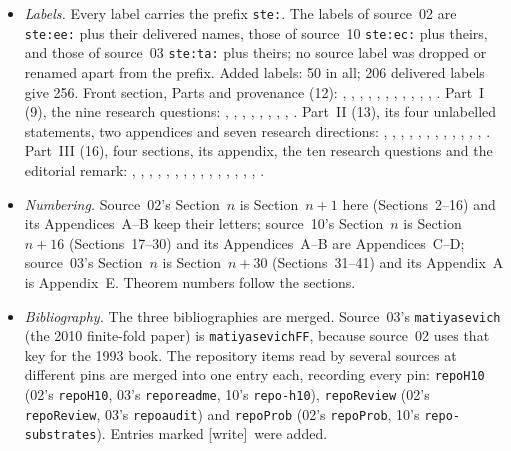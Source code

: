 \documentclass[11pt,letterpaper]{article}
\theoremstyle{definition}
\theoremstyle{remark}
\newcommand{\wtag}{\textup{[write]}}
\begin{document}
\begin{itemize}
\item \emph{Labels.} Every label carries the prefix \texttt{ste:}. The labels of source~02 are \texttt{ste:ee:} plus their delivered names, those of source~10 \texttt{ste:ec:} plus theirs, and those of source~03 \texttt{ste:ta:} plus theirs; no source label was dropped or renamed apart from the prefix. Added labels: 50 in all; 206 delivered labels give 256. Front section, Parts and provenance (12): , , , , , , , , , , , . Part~I (9), the nine research questions: , , , , , , , , . Part~II (13), its four unlabelled statements, two appendices and seven research directions: , , , , , , , , , , , , . Part~III (16), four sections, its appendix, the ten research questions and the editorial remark: , , , , , , , , , , , , , , , .
\item \emph{Numbering.} Source~02's Section~$n$ is Section~$n+1$ here (Sections~2--16) and its Appendices~A--B keep their letters; source~10's Section~$n$ is Section~$n+16$ (Sections~17--30) and its Appendices~A--B are Appendices~C--D; source~03's Section~$n$ is Section~$n+30$ (Sections~31--41) and its Appendix~A is Appendix~E. Theorem numbers follow the sections.
\item \emph{Bibliography.} The three bibliographies are merged. Source~03's \texttt{matiyasevich} (the 2010 finite-fold paper) is \texttt{matiyasevichFF}, because source~02 uses that key for the 1993 book. The repository items read by several sources at different pins are merged into one entry each, recording every pin: \texttt{repoH10} (02's \texttt{repoH10}, 03's \texttt{reporeadme}, 10's \texttt{repo-h10}), \texttt{repoReview} (02's \texttt{repoReview}, 03's \texttt{repoaudit}) and \texttt{repoProb} (02's \texttt{repoProb}, 10's \texttt{repo-substrates}). Entries marked \wtag\ were added.

\end{itemize}
\end{document}
